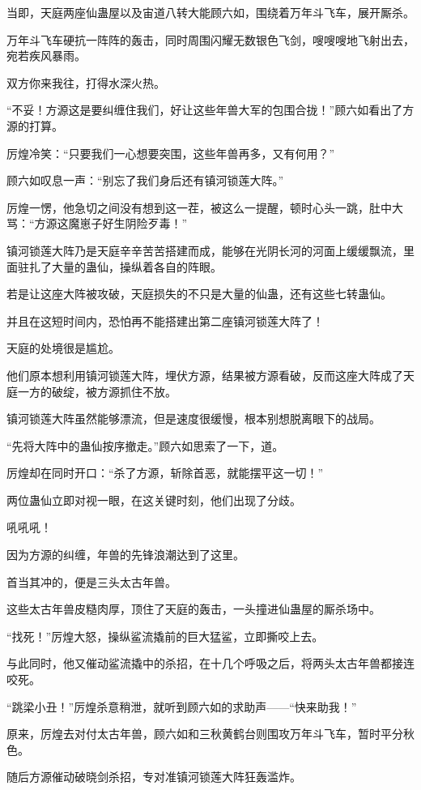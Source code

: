 \begin{this_body}
当即，天庭两座仙蛊屋以及宙道八转大能顾六如，围绕着万年斗飞车，展开厮杀。

万年斗飞车硬抗一阵阵的轰击，同时周围闪耀无数银色飞剑，嗖嗖嗖地飞射出去，宛若疾风暴雨。

双方你来我往，打得水深火热。

“不妥！方源这是要纠缠住我们，好让这些年兽大军的包围合拢！”顾六如看出了方源的打算。

厉煌冷笑：“只要我们一心想要突围，这些年兽再多，又有何用？”

顾六如叹息一声：“别忘了我们身后还有镇河锁莲大阵。”

厉煌一愣，他急切之间没有想到这一茬，被这么一提醒，顿时心头一跳，肚中大骂：“方源这魔崽子好生阴险歹毒！”

镇河锁莲大阵乃是天庭辛辛苦苦搭建而成，能够在光阴长河的河面上缓缓飘流，里面驻扎了大量的蛊仙，操纵着各自的阵眼。

若是让这座大阵被攻破，天庭损失的不只是大量的仙蛊，还有这些七转蛊仙。

并且在这短时间内，恐怕再不能搭建出第二座镇河锁莲大阵了！

天庭的处境很是尴尬。

他们原本想利用镇河锁莲大阵，埋伏方源，结果被方源看破，反而这座大阵成了天庭一方的破绽，被方源抓住不放。

镇河锁莲大阵虽然能够漂流，但是速度很缓慢，根本别想脱离眼下的战局。

“先将大阵中的蛊仙按序撤走。”顾六如思索了一下，道。

厉煌却在同时开口：“杀了方源，斩除首恶，就能摆平这一切！”

两位蛊仙立即对视一眼，在这关键时刻，他们出现了分歧。

吼吼吼！

因为方源的纠缠，年兽的先锋浪潮达到了这里。

首当其冲的，便是三头太古年兽。

这些太古年兽皮糙肉厚，顶住了天庭的轰击，一头撞进仙蛊屋的厮杀场中。

“找死！”厉煌大怒，操纵鲨流撬前的巨大猛鲨，立即撕咬上去。

与此同时，他又催动鲨流撬中的杀招，在十几个呼吸之后，将两头太古年兽都接连咬死。

“跳梁小丑！”厉煌杀意稍泄，就听到顾六如的求助声——“快来助我！”

原来，厉煌去对付太古年兽，顾六如和三秋黄鹤台则围攻万年斗飞车，暂时平分秋色。

随后方源催动破晓剑杀招，专对准镇河锁莲大阵狂轰滥炸。


\end{this_body}
